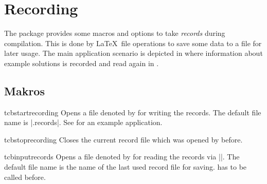 \clearpage
\section{Recording}\label{sec:recording}%
%
The package provides some macros and options to take \emph{records} during
compilation. This is done by \LaTeX\ file operations to save some data
to a file for later usage. The main application scenario is depicted in
 where
information about example solutions is recorded and read again
in .

\subsection{Makros}\label{sec:recording-makros}
\begin{docCommand}[doc new=2014-11-28]{tcbstartrecording}{}
  Opens a file denoted by  for writing the records.
  The default file name is |\jobname.records|.
  See  for an example application.
\end{docCommand}


\begin{docCommand}[doc new=2014-11-28]{tcbstoprecording}{}
  Closes the current record file which was opened by 
  before.
\end{docCommand}

\begin{docCommand}[doc new=2014-11-28]{tcbinputrecords}{}
  Opens a file denoted by  for reading the records via ||.
  The default file name is the name of the last used record file for saving.
   has to be called before.
\end{docCommand}


